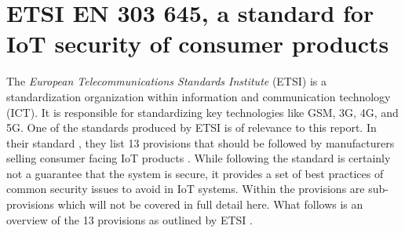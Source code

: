 \section{ETSI EN 303 645, a standard for IoT security of consumer products} \label{ch:related-work:etsi}
The \textit{European Telecommunications Standards Institute} (ETSI) is a standardization organization within information and communication technology (ICT). It is responsible for standardizing key technologies like GSM, 3G, 4G, and 5G. One of the standards produced by ETSI is of relevance to this report. In their standard , they list 13 provisions that should be followed by manufacturers selling consumer facing IoT products \cite{etsi-iot-standard}. While following the standard is certainly not a guarantee that the system is secure, it provides a set of best practices of common security issues to avoid in IoT systems. Within the provisions are sub-provisions which will not be covered in full detail here. What follows is an overview of the 13 provisions as outlined by ETSI \cite{etsi-iot-standard}.
